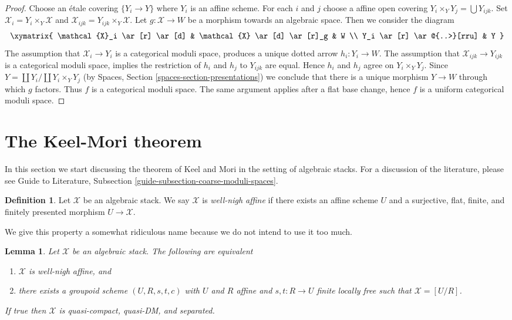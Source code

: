 \documentclass[10pt,a4paper]{amsart}
\theoremstyle{plain}
\newtheorem{lemma}[subsection]{Lemma}
\theoremstyle{definition}
\newtheorem{definition}[subsection]{Definition}
\theoremstyle{remark}
\numberwithin{equation}{subsection}
\begin{document}
\begin{proof}
Choose an \'etale covering $\{Y_i \to Y\}$ where $Y_i$ is an affine scheme.
For each $i$ and $j$ choose a affine open covering
$Y_i \times_Y Y_j = \bigcup Y_{ijk}$.
Set $\mathcal{X}_i = Y_i \times_Y \mathcal{X}$ and
$\mathcal{X}_{ijk} = Y_{ijk} \times_Y \mathcal{X}$.
Let $g : \mathcal{X} \to W$ be a morphism towards
an algebraic space. Then we consider the diagram
$$
\xymatrix{
\mathcal{X}_i \ar[r] \ar[d] & \mathcal{X} \ar[d] \ar[r]_g & W \\
Y_i \ar[r] \ar@{..>}[rru] & Y
}
$$
The assumption that $\mathcal{X}_i \to Y_i$ is a categorical moduli
space, produces a unique dotted arrow $h_i : Y_i \to W$.
The assumption that $\mathcal{X}_{ijk} \to Y_{ijk}$ is a categorical
moduli space, implies the restriction of $h_i$ and $h_j$ to
$Y_{ijk}$ are equal. Hence $h_i$ and $h_j$ agree on $Y_i \times_Y Y_j$.
Since $Y = \coprod Y_i / \coprod Y_i \times_Y Y_j$
(by Spaces, Section \ref{spaces-section-presentations}) we conclude
that there is a unique morphism $Y \to W$ through which $g$ factors.
Thus $f$ is a categorical moduli space. The same argument applies
after a flat base change, hence $f$ is a uniform categorical moduli space.
\end{proof}







\section{The Keel-Mori theorem}
\label{section-Keel-Mori}

\noindent
In this section we start discussing the theorem of Keel and Mori
in the setting of algebraic stacks. For a discussion of the
literature, please see Guide to Literature, Subsection
\ref{guide-subsection-coarse-moduli-spaces}.

\begin{definition}
\label{definition-well-nigh-affine}
Let $\mathcal{X}$ be an algebraic stack. We say $\mathcal{X}$
is {\it well-nigh affine} if there exists an affine scheme $U$
and a surjective, flat, finite, and finitely presented morphism
$U \to \mathcal{X}$.
\end{definition}

\noindent
We give this property a somewhat ridiculous name because we do not intend to
use it too much.

\begin{lemma}
\label{lemma-well-nigh-affine}
Let $\mathcal{X}$ be an algebraic stack. The following are equivalent
\begin{enumerate}
\item $\mathcal{X}$ is well-nigh affine, and
\item there exists a groupoid scheme $(U, R, s, t, c)$ with $U$ and
$R$ affine and $s, t : R \to U$ finite locally free such that
$\mathcal{X} = [U/R]$.
\end{enumerate}
If true then $\mathcal{X}$ is quasi-compact, quasi-DM, and separated.
\end{lemma}
\end{document}
